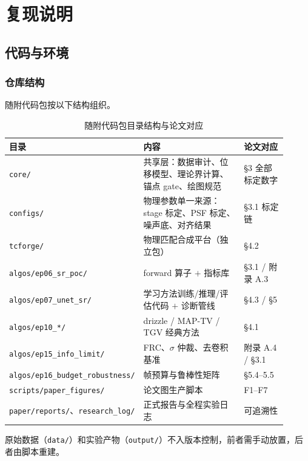 \section{复现说明}

\subsection{代码与环境}

\subsubsection{仓库结构}

随附代码包按以下结构组织。

\begin{table}[ht]
  \centering
  \caption{随附代码包目录结构与论文对应}
  \label{tab:repo-structure}
  \small
  \begin{tabular}{p{0.27\linewidth}p{0.46\linewidth}p{0.18\linewidth}}
    \toprule
    目录 & 内容 & 论文对应 \\
    \midrule
    \texttt{core/} & 共享层：数据审计、位移模型、理论界计算、锚点 gate、绘图规范 & \S3 全部标定数字 \\
    \texttt{configs/} & 物理参数单一来源：stage 标定、PSF 标定、噪声底、对齐结果 & \S3.1 标定链 \\
    \texttt{tcforge/} & 物理匹配合成平台（独立包） & \S4.2 \\
    \texttt{algos/ep06\_sr\_poc/} & forward 算子 \(+\) 指标库 & \S3.1 / 附录 A.3 \\
    \texttt{algos/ep07\_unet\_sr/} & 学习方法训练/推理/评估代码 \(+\) 诊断管线 & \S4.3 / \S5 \\
    \texttt{algos/ep10\_*/} & drizzle / MAP-TV / TGV 经典方法 & \S4.1 \\
    \texttt{algos/ep15\_info\_limit/} & FRC、\(\sigma\) 仲裁、去卷积基准 & 附录 A.4 / \S3.1 \\
    \texttt{algos/ep16\_budget\_robustness/} & 帧预算与鲁棒性矩阵 & \S5.4--5.5 \\
    \texttt{scripts/paper\_figures/} & 论文图生产脚本 & F1--F7 \\
    \texttt{paper/reports/}、\texttt{research\_log/} & 正式报告与全程实验日志 & 可追溯性 \\
    \bottomrule
  \end{tabular}
\end{table}

原始数据（\texttt{data/}）和实验产物（\texttt{output/}）不入版本控制，前者需手动放置，后者由脚本重建。

